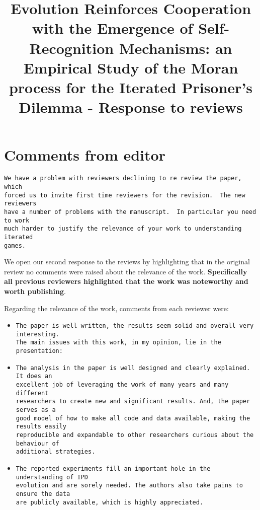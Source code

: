 \documentclass[a4]{article}
\title{Evolution Reinforces Cooperation with the Emergence of Self-Recognition
       Mechanisms: an Empirical Study of the Moran process for the Iterated
       Prisoner's Dilemma - Response to reviews}
\begin{document}
\maketitle

\section{Comments from editor}

\begin{verbatim}
We have a problem with reviewers declining to re review the paper, which
forced us to invite first time reviewers for the revision.  The new reviewers
have a number of problems with the manuscript.  In particular you need to work
much harder to justify the relevance of your work to understanding iterated
games.
\end{verbatim}

We open our second response to the reviews by highlighting that in the original
review no comments were raised about the relevance of the work.
\textbf{Specifically all previous reviewers highlighted that the work was
noteworthy and worth publishing}.

Regarding the relevance of the work, comments from each reviewer were:

\begin{itemize}
    \item 
\begin{verbatim}
The paper is well written, the results seem solid and overall very interesting.
The main issues with this work, in my opinion, lie in the presentation:
\end{verbatim}
    \item 

\begin{verbatim}
The analysis in the paper is well designed and clearly explained. It does an
excellent job of leveraging the work of many years and many different
researchers to create new and significant results. And, the paper serves as a
good model of how to make all code and data available, making the results easily
reproducible and expandable to other researchers curious about the behaviour of
additional strategies.
\end{verbatim}
    \item 

\begin{verbatim}
The reported experiments fill an important hole in the understanding of IPD
evolution and are sorely needed. The authors also take pains to ensure the data
are publicly available, which is highly appreciated.
\end{verbatim}
\end{itemize}
\end{document}
